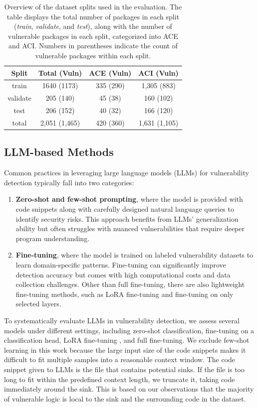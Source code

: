 \documentclass[12pt,openany,oneside,table]{cmuthesis}
\begin{document}
\begin{table}[t]
\centering
\caption{Overview of the dataset splits used in the evaluation. The table displays the total number of packages in each split (\textit{train}, \textit{validate}, and \textit{test}), along with the number of vulnerable packages in each split, categorized into ACE and ACI. Numbers in parentheses indicate the count of vulnerable packages within each split.
}
\label{tab:dataset-overview}
\begin{tabular}{|c|c|c|c|}
\hline
\textbf{Split} & \textbf{Total (Vuln)} & \textbf{ACE (Vuln)} & \textbf{ACI (Vuln)} \\ \hline
train & 1640 (1173) & 335 (290) & 1,305 (883) \\ \hline
validate & 205 (140) & 45 (38) & 160 (102) \\ \hline
test & 206 (152) & 40 (32) & 166 (120) \\ \hline
total & 2,051 (1,465) & 420 (360) & 1,631 (1,105) \\ \hline
\end{tabular}
\end{table}




\subsection{LLM-based Methods}\label{subsec:llm_methods}
Common practices in leveraging large language models (LLMs) for vulnerability detection typically fall into two categories:
\begin{enumerate}
    \item \textbf{Zero-shot and few-shot prompting}, where the model is provided with code snippets along with carefully designed natural language queries to identify security risks. This approach benefits from LLMs' generalization ability but often struggles with nuanced vulnerabilities that require deeper program understanding.
    \item \textbf{Fine-tuning}, where the model is trained on labeled vulnerability datasets to learn domain-specific patterns. Fine-tuning can significantly improve detection accuracy but comes with high computational costs and data collection challenges. Other than full fine-tuning, there are also lightweight fine-tuning methods, such as LoRA fine-tuning \cite{lora, qlora} and fine-tuning on only selected layers.
\end{enumerate}

To systematically evaluate LLMs in vulnerability detection, we assess several models under different settings, including zero-shot classification, fine-tuning on a classification head, LoRA fine-tuning \cite{lora, qlora}, and full fine-tuning. We exclude few-shot learning in this work because the large input size of the code snippets makes it difficult to fit multiple samples into a reasonable context window.
The code snippet given to LLMs is the file that contains potential sinks. If the file is too long to fit within the predefined context length, we truncate it, taking code immediately around the sink. This is based on our observations that the majority of vulnerable logic is local to the sink and the surrounding code in the dataset. 
\end{document}
